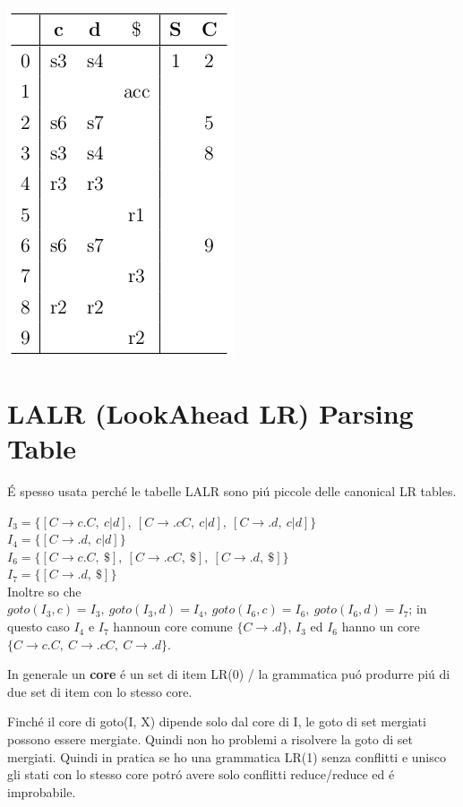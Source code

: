 \begin{center}
    \includegraphics[scale=0.6]{Chapters/Img/c04_14.png}\\
\end{center}

\section{LALR (LookAhead LR) Parsing Table}
\'E spesso usata perch\'e le tabelle LALR sono pi\'u piccole delle canonical LR tables. 

$I_3 = \{ [C \rightarrow c.C,\ c|d],\ [C \rightarrow .cC,\ c|d],\ [C \rightarrow .d,\ c|d] \}$\\
$I_4 = \{ [C \rightarrow .d,\ c|d] \}$\\
$I_6 = \{ [C \rightarrow c.C,\ \$ ],\ [C \rightarrow .cC,\ \$ ],\ [C \rightarrow .d,\ \$ ] \}$\\
$I_7 = \{ [C \rightarrow .d,\ \$ ] \}$\\

Inoltre so che $goto(I_3, c) = I_3,\ goto(I_3,d) = I_4,\ goto(I_6,c)=I_6,\ goto(I_6, d) = I_7$;
in questo caso $I_4$ e $I_7$ hannoun core comune $\{ C \rightarrow .d \}$, $I_3$ ed $I_6$ hanno un core 
$\{ C \rightarrow c.C,\ C\rightarrow .cC,\ C \rightarrow .d \}$.

In generale un \textbf{core} \'e un set di item LR(0) / la grammatica pu\'o produrre pi\'u di due set di item con lo stesso core.

Finch\'e il core di goto(I, X) dipende solo dal core di I, le goto di set mergiati possono essere mergiate. Quindi non ho problemi 
a risolvere la goto di set mergiati. Quindi in pratica se ho una grammatica LR(1) senza conflitti e unisco gli stati con lo stesso core 
potr\'o avere solo conflitti reduce/reduce ed \'e improbabile.

